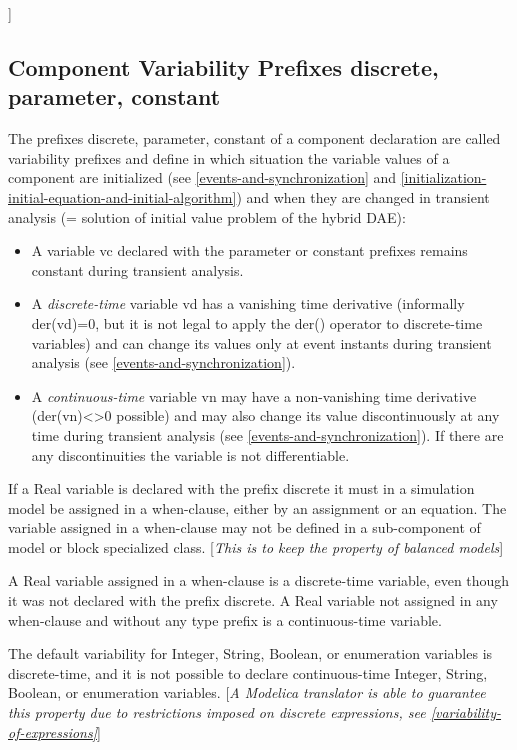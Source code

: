 \documentclass[10pt,a4paper]{report}
\def\doublelabel#1{\label{#1}\hypertarget{#1}{}}
\begin{document}
{]}

\subsection{Component Variability Prefixes discrete, parameter, constant}\doublelabel{component-variability-prefixes-discrete-parameter-constant}

The prefixes discrete, parameter, constant of a component declaration
are called variability prefixes and define in which situation the
variable values of a component are initialized (see \ref{events-and-synchronization} and
\ref{initialization-initial-equation-and-initial-algorithm}) and when they are changed in transient analysis (= solution
of initial value problem of the hybrid DAE):

\begin{itemize}
\item
  A variable vc declared with the parameter or constant prefixes remains
  constant during transient analysis.
\item
  A \emph{discrete-time} variable vd has a vanishing time derivative
  (informally der(vd)=0, but it is not legal to apply the der() operator
  to discrete-time variables) and can change its values only at event
  instants during transient analysis (see \ref{events-and-synchronization}).
\item
  A \emph{continuous-time} variable vn may have a non-vanishing time
  derivative (der(vn)\textless{}\textgreater{}0 possible) and may also
  change its value discontinuously at any time during transient analysis
  (see \ref{events-and-synchronization}). If there are any discontinuities the variable is
  not differentiable.
\end{itemize}

If a Real variable is declared with the prefix discrete it must in a
simulation model be assigned in a when-clause, either by an assignment
or an equation. The variable assigned in a when-clause may not be
defined in a sub-component of model or block specialized class.
{[}\emph{This is to keep the property of balanced models}{]}

A Real variable assigned in a when-clause is a discrete-time variable,
even though it was not declared with the prefix discrete. A Real
variable not assigned in any when-clause and without any type prefix is
a continuous-time variable.

The default variability for Integer, String, Boolean, or enumeration
variables is discrete-time, and it is not possible to declare
continuous-time Integer, String, Boolean, or enumeration variables.
{[}\emph{A Modelica translator is able to guarantee this property due to
restrictions imposed on discrete expressions, see \ref{variability-of-expressions}}{]}
\end{document}
